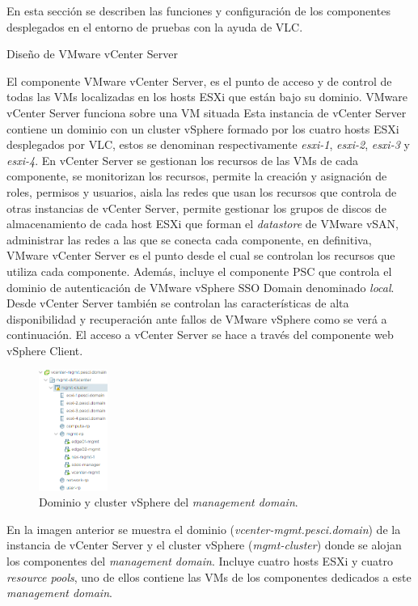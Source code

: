 En esta sección se describen las funciones y configuración de los componentes desplegados en el entorno de pruebas con la ayuda de VLC. 

\begin{subsubsection}{Diseño de VMware vCenter Server}

El componente VMware vCenter Server, es el punto de acceso y de control de todas las VMs localizadas en los hosts ESXi que están bajo su dominio. VMware vCenter Server funciona sobre una VM situada Esta instancia de vCenter Server contiene un dominio con un cluster vSphere formado por los cuatro hosts ESXi desplegados por VLC, estos se denominan respectivamente \textit{esxi-1}, \textit{esxi-2}, \textit{esxi-3} y \textit{esxi-4}. En vCenter Server se gestionan los recursos de las VMs de cada componente, se monitorizan los recursos, permite la creación y asignación de roles, permisos y usuarios, aisla las redes que usan los recursos que controla de otras instancias de vCenter Server, permite gestionar los grupos de discos de almacenamiento de cada host ESXi que forman el \textit{datastore} de VMware vSAN, administrar las redes a las que se conecta cada componente, en definitiva, VMware vCenter Server es el punto desde el cual se controlan los recursos que utiliza cada componente. Además, incluye el componente PSC que controla el dominio de autenticación de VMware vSphere SSO Domain denominado \textit{local}. Desde vCenter Server también se controlan las características de alta disponibilidad y recuperación ante fallos de VMware vSphere como se verá a continuación. El acceso a vCenter Server se hace a través del componente web vSphere Client.
\begin{figure}[h]
  \centering
  \includegraphics[width=0.2\textwidth]{imaxes/pruebaconcepto/clusterVCenterServer.png}
  \caption{Dominio y cluster vSphere del \textit{management domain}.}
  \label{fig:cluster-vCenter-Server}
\end{figure}
\FloatBarrier
En la imagen anterior se muestra el dominio (\textit{vcenter-mgmt.pesci.domain}) de la instancia de vCenter Server y el cluster vSphere (\textit{mgmt-cluster}) donde se alojan los componentes del \textit{management domain}. Incluye cuatro hosts ESXi y cuatro \textit{resource pools}, uno de ellos contiene las VMs de los componentes dedicados a este \textit{management domain}.

\end{subsubsection}
